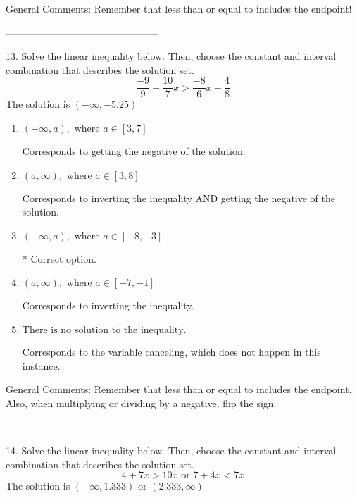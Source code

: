 \documentclass{article}[10pt]
\begin{document}
General Comments: Remember that less than or equal to includes the endpoint!

-----------------------------------------------

13. Solve the linear inequality below. Then, choose the constant and interval combination that describes the solution set.
$$ \frac{-9}{9} - \frac{10}{7} x > \frac{-8}{6} x - \frac{4}{8} $$ 
The solution is $ (-\infty, -5.25) $ 

\begin{enumerate}[label=\Alph*.] 
\item $ (-\infty, a), \text{ where } a \in [3, 7] $ 

 Corresponds to getting the negative of the solution. 
\item $ (a, \infty), \text{ where } a \in [3, 8] $ 

 Corresponds to inverting the inequality AND getting the negative of the solution. 
\item $ (-\infty, a), \text{ where } a \in [-8, -3] $ 

  * Correct option. 
\item $ (a, \infty), \text{ where } a \in [-7, -1] $ 

 Corresponds to inverting the inequality. 
\item $ \text{There is no solution to the inequality.} $ 

 Corresponds to the variable canceling, which does not happen in this instance. 
\end{enumerate} 
 
General Comments: Remember that less than or equal to includes the endpoint. Also, when multiplying or dividing by a negative, flip the sign.

-----------------------------------------------

14. Solve the linear inequality below. Then, choose the constant and interval combination that describes the solution set.
$$ 4 + 7 x > 10 x \text{ or } 7 + 4 x < 7 x $$ 
The solution is $ (-\infty, 1.333) \text{ or } (2.333, \infty) $ 
\end{document}
